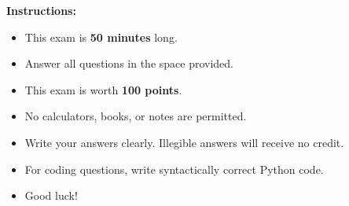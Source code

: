 \documentclass{csexam}
\begin{document}
\maketitle

\begin{rules}
\textbf{Instructions:}
\begin{itemize}
    \item This exam is \textbf{50 minutes} long.
    \item Answer all questions in the space provided.
    \item This exam is worth \textbf{100 points}.
    \item No calculators, books, or notes are permitted.
    \item Write your answers clearly. Illegible answers will receive no credit.
    \item For coding questions, write syntactically correct Python code.
    \item Good luck!
\end{itemize}
\end{rules}

\vspace{5mm}

\showgrade

\newpage
\end{document}
